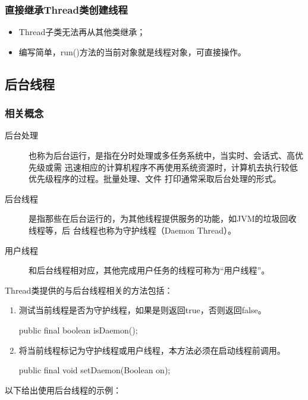 \subsubsection{直接继承Thread类创建线程}

\begin{itemize}
\item Thread子类无法再从其他类继承；
\item 编写简单，run()方法的当前对象就是线程对象，可直接操作。
\end{itemize}

\subsection{后台线程}

\subsubsection{相关概念}
\begin{description}
\item[后台处理] 也称为后台运行，是指在分时处理或多任务系统中，当实时、会话式、高优先级或需
迅速相应的计算机程序不再使用系统资源时，计算机去执行较低优先级程序的过程。批量处理、文件
打印通常采取后台处理的形式。
\item[后台线程] 是指那些在后台运行的，为其他线程提供服务的功能，如JVM的垃圾回收线程等，后
台线程也称为守护线程（Daemon Thread）。
\item[用户线程] 和后台线程相对应，其他完成用户任务的线程可称为“用户线程”。
\end{description}

Thread类提供的与后台线程相关的方法包括：

\begin{enumerate}
\item 测试当前线程是否为守护线程，如果是则返回true，否则返回false。
\begin{javaCode}
public final boolean isDaemon();
\end{javaCode}
\item 将当前线程标记为守护线程或用户线程，本方法必须在启动线程前调用。
\begin{javaCode}
public final void setDaemon(Boolean on);
\end{javaCode}
\end{enumerate}

以下给出使用后台线程的示例：


